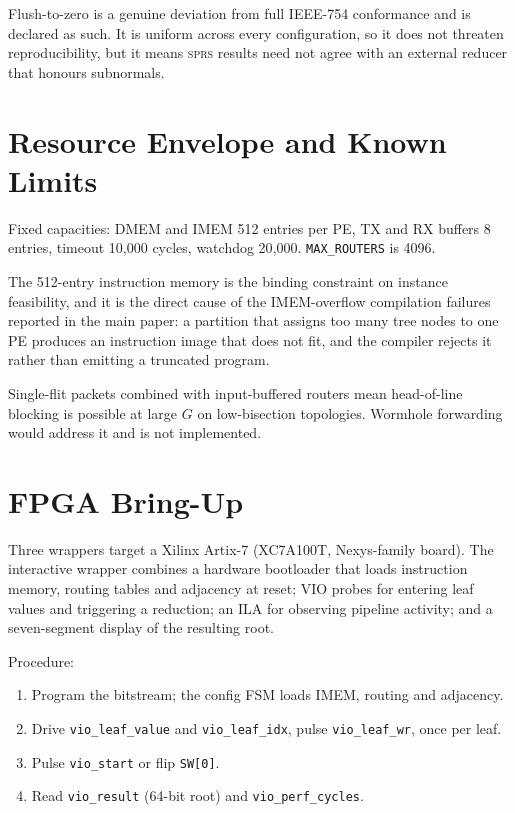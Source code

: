 \documentclass[journal,10pt]{IEEEtran}
\newcommand{\sprs}{\textsc{sprs}}
\newcommand{\sv}[1]{\texttt{#1}}
\begin{document}
Flush-to-zero is a genuine deviation from full IEEE-754 conformance and is
declared as such. It is uniform across every configuration, so it does not
threaten reproducibility, but it means \sprs{} results need not agree with an
external reducer that honours subnormals.

\section{Resource Envelope and Known Limits}

Fixed capacities: DMEM and IMEM 512 entries per PE, TX and RX buffers 8
entries, timeout 10{,}000 cycles, watchdog 20{,}000. \sv{MAX\_ROUTERS} is
4096.

The 512-entry instruction memory is the binding constraint on instance
feasibility, and it is the direct cause of the IMEM-overflow compilation
failures reported in the main paper: a partition that assigns too many tree
nodes to one PE produces an instruction image that does not fit, and the
compiler rejects it rather than emitting a truncated program.

Single-flit packets combined with input-buffered routers mean head-of-line
blocking is possible at large $G$ on low-bisection topologies. Wormhole
forwarding would address it and is not implemented.

\section{FPGA Bring-Up}

Three wrappers target a Xilinx Artix-7 (XC7A100T, Nexys-family board). The
interactive wrapper combines a hardware bootloader that loads instruction
memory, routing tables and adjacency at reset; VIO probes for entering leaf
values and triggering a reduction; an ILA for observing pipeline activity;
and a seven-segment display of the resulting root.

Procedure:
\begin{enumerate}
\item Program the bitstream; the config FSM loads IMEM, routing and adjacency.
\item Drive \sv{vio\_leaf\_value} and \sv{vio\_leaf\_idx}, pulse
      \sv{vio\_leaf\_wr}, once per leaf.
\item Pulse \sv{vio\_start} or flip \sv{SW[0]}.
\item Read \sv{vio\_result} (64-bit root) and \sv{vio\_perf\_cycles}.
\end{enumerate}
\end{document}
